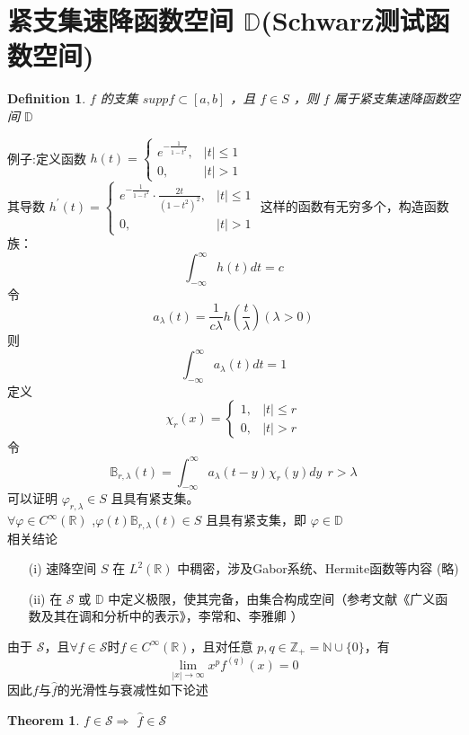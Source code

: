 \documentclass[linespread=1.5,openany]{book}%
\theoremstyle{plain}
\newtheorem{theorem}{Theorem}
\newtheorem{definition}{Definition}
\begin{document}
{			\section{紧支集速降函数空间 \(\mathbb{D}\)(Schwarz测试函数空间)}
			\begin{definition}
				\(f\) 的支集 \(supp f\subset [a,b]\) ，且 \(f \in S\) ，则 \(f\) 属于紧支集速降函数空间 \(\mathbb{D}\) 
			\end{definition}
			例子:定义函数 \(h(t)=\begin{cases}e^{-\frac{1}{1 - t^{2}}},& |t|\leq 1 \\ 0, & |t| > 1\end{cases}\) \\其导数 \(h^{\prime}(t)=\begin{cases}e^{-\frac{1}{1 - t^{2}}}\cdot\frac{2t}{(1 - t^{2})^{2}},& |t|\leq 1 \\ 0, & |t| > 1\end{cases}\) 
			这样的函数有无穷多个，构造函数族：
			\[\int_{-\infty}^{\infty}h(t)dt = c\] 令 \[a_{\lambda}(t)=\frac{1}{c\lambda}h(\frac{t}{\lambda})(\lambda > 0)\] 则 \[\int_{-\infty}^{\infty}a_{\lambda}(t)dt = 1\] 定义 \[\chi_{r}(x)=\begin{cases}1, & |t|\leq r \\ 0, & |t| > r\end{cases}\] 
			令 \[\mathbb{B}_{r,\lambda}(t)= \int_{-\infty}^{\infty}a_{\lambda}(t - y)\chi_{r}(y)dy\ \ r > \lambda\] 
			可以证明 \(\varphi_{r,\lambda} \in S\) 且具有紧支集。\\
			\(\forall \varphi \in C^{\infty}(\mathbb{R})\) ,\(\varphi(t)\mathbb{B}_{r,\lambda}(t) \in S\) 且具有紧支集，即 \(\varphi \in \mathbb{D}\) \\
			相关结论
			\begin{itemize}
				\item [(i)]速降空间 \(S\) 在 \(L^{2}(\mathbb{R})\) 中稠密，涉及Gabor系统、Hermite函数等内容 (略)\\
				\item[(ii)]在 \(\mathcal{S}\) 或 \(\mathbb{D}\) 中定义极限，使其完备，由集合构成空间（参考文献《广义函数及其在调和分析中的表示》，李常和、李雅卿 ）
			\end{itemize}
			由于 \( \mathcal{S}\)，且\(\forall f \in \mathcal{S}\)时\( f \in C^{\infty}(\mathbb{R}) \)，且对任意 \( p, q \in \mathbb{Z}_{+} = \mathbb{N} \cup \{0\} \)，有 \[ \lim_{|x| \to \infty} x^{p}f^{(q)}(x) = 0 \]因此$f$与$\hat{f}$的光滑性与衰减性如下论述
			\begin{theorem}
				\( f \in \mathcal{S} \)$\Longrightarrow$ \( \hat{f} \in \mathcal{S} \)

\end{theorem}}
\end{document}
